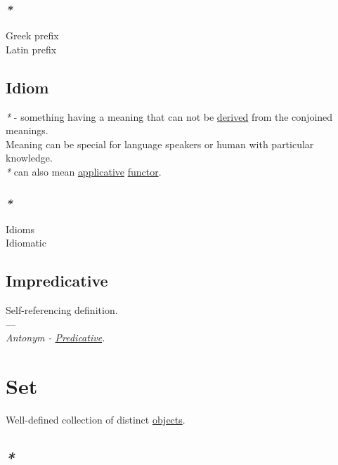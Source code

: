 \documentclass[a4paper,14pt,oneside]{book}
\begin{document}
\subsection{\emph{*}}
\label{sec:orgfc4d134}

\label{org4bdbc68}Greek prefix\\
\label{org52a7a10}Latin prefix\\

\section{\label{org5ad446b}Idiom}
\label{sec:org81bf85c}
\emph{*} - something having a meaning that can not be \hyperref[org14b6bbd]{derived} from the conjoined meanings.\\
Meaning can be special for language speakers or human with particular knowledge.\\

\emph{*} can also mean \hyperref[orgdf8a48b]{applicative} \hyperref[orgf855504]{functor}.\\

\subsection{\emph{*}}
\label{sec:org9e80e75}

\label{orgc04310e}Idioms\\
\label{org95bb6a3}Idiomatic\\

\section{\label{org1e0d382}Impredicative}
\label{sec:org4be66c9}
Self-referencing definition.\\

---\\

\emph{Antonym - \hyperref[orgcc4ef8d]{Predicative}.}\\

\chapter{\label{org0f7f8fa}Set}
\label{sec:orgcad6162}
Well-defined collection of distinct \hyperref[orgd42a7f2]{objects}.\\

\section{\emph{*}}
\label{sec:org983bb09}
\end{document}
